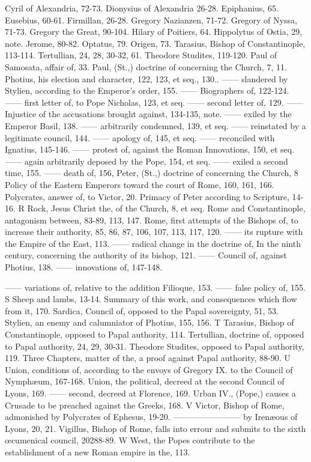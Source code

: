 Cyril of Alexandria, 72-73. Dionysius of Alexandria 26-28. Epiphanius, 65. Eusebius, 60-61. Firmillan, 26-28. Gregory Nazianzen, 71-72. Gregory of Nyssa, 71-73. Gregory the Great, 90-104. Hilary of Poitiers, 64. Hippolytus of Ostia, 29, note. Jerome, 80-82. Optatus, 79. Origen, 73. Tarasius, Bishop of Constantinople, 113-114. Tertullian, 24, 28, 30-32, 61. Theodore Studites, 119-120. Paul of Samosata, affair of, 33. Paul, (St.,) doctrine of concerning the Church, 7, 11. Photius, his election and character, 122, 123, et seq., 130.. —— slandered by Stylien, according to the Emperor's order, 155. —— Biographers of, 122-124. —— first letter of, to Pope Nicholas, 123, et seq. —— second letter of, 129. —— Injustice of the accusations brought against, 134-135, note. —— exiled by the Emperor Basil, 138. —— arbitrarily condemned, 139, et seq. —— reinstated by a legitimate council, 144. —— apology of, 145, et seq. —— reconciled with Ignatius, 145-146. —— protest of, against the Roman Innovations, 150, et seq. —— again arbitrarily deposed by the Pope, 154, et seq. —— exiled a second time, 155. —— death of, 156, Peter, (St.,) doctrine of concerning the Church, 8 Policy of the Eastern Emperors toward the court of Rome, 160, 161, 166. Polycrates, answer of, to Victor, 20. Primacy of Peter according to Scripture, 14-16. R Rock, Jesus Christ the, of the Church, 8, et seq. Rome and Constantinople, antagonism between, 83-89, 113, 147. Rome, first attempts of the Bishops of, to increase their authority, 85, 86, 87, 106, 107, 113, 117, 120. —— its rupture with the Empire of the East, 113. —— radical change in the doctrine of, In the ninth century, concerning the authority of its bishop, 121. —— Council of, against Photius, 138. —— innovations of, 147-148.

—— variations of, relative to the addition Filioque, 153. —— false policy of, 155. S Sheep and lambs, 13-14. Summary of this work, and consequences which flow from it, 170. Sardica, Council of, opposed to the Papal sovereignty, 51, 53. Stylien, an enemy and calumniator of Photius, 155, 156. T Tarasius, Bishop of Constantinople, opposed to Papal authority, 114. Tertullian, doctrine of, opposed to Papal authority, 24, 29, 30-31. Theodore Studites, opposed to Papal authority, 119. Three Chapters, matter of the, a proof against Papal authority, 88-90. U Union, conditions of, according to the envoys of Gregory IX. to the Council of Nymphæum, 167-168. Union, the political, decreed at the second Council of Lyons, 169. —— second, decreed at Florence, 169. Urban IV., (Pope,) causes a Crusade to be preached against the Greeks, 168. V Victor, Bishop of Rome, admonished by Polycrates of Ephesus, 19-20. ———————— by Irenæous of Lyons, 20, 21. Vigillus, Bishop of Rome, falls into errour and submits to the sixth œcumenical council, 20288-89. W West, the Popes contribute to the establishment of a new Roman empire in the, 113.
